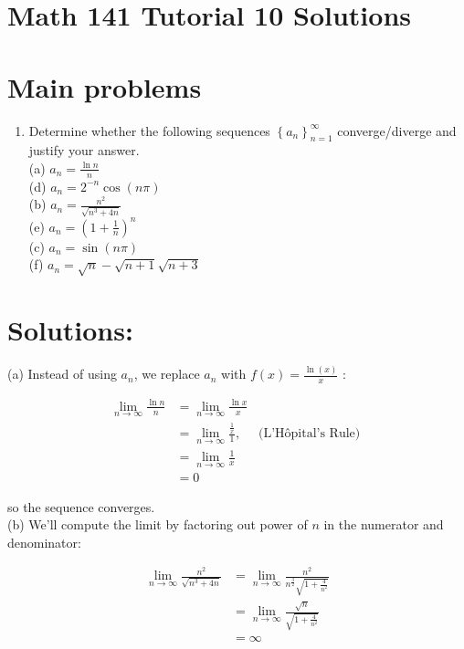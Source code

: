 \documentclass[10pt]{article}
\begin{document}
\section*{Math 141 Tutorial 10 Solutions}
\section*{Main problems}
\begin{enumerate}
  \item Determine whether the following sequences $\left\{a_{n}\right\}_{n=1}^{\infty}$ converge/diverge and justify your answer.\\
(a) $a_{n}=\frac{\ln n}{n}$\\
(d) $a_{n}=2^{-n} \cos (n \pi)$\\
(b) $a_{n}=\frac{n^{2}}{\sqrt{n^{3}+4 n}}$\\
(e) $a_{n}=\left(1+\frac{1}{n}\right)^{n}$\\
(c) $a_{n}=\sin (n \pi)$\\
(f) $a_{n}=\sqrt{n}-\sqrt{n+1} \sqrt{n+3}$
\end{enumerate}

\section*{Solutions:}
(a) Instead of using $a_{n}$, we replace $a_{n}$ with $f(x)=\frac{\ln (x)}{x}$ :

$$
\begin{aligned}
\lim _{n \rightarrow \infty} \frac{\ln n}{n} & =\lim _{n \rightarrow \infty} \frac{\ln x}{x} \\
& =\lim _{n \rightarrow \infty} \frac{\frac{1}{x}}{1}, \quad \text { (L'Hôpital's Rule) } \\
& =\lim _{n \rightarrow \infty} \frac{1}{x} \\
& =0
\end{aligned}
$$

so the sequence converges.\\
(b) We'll compute the limit by factoring out power of $n$ in the numerator and denominator:

$$
\begin{aligned}
\lim _{n \rightarrow \infty} \frac{n^{2}}{\sqrt{n^{3}+4 n}} & =\lim _{n \rightarrow \infty} \frac{n^{2}}{n^{\frac{3}{2}} \sqrt{1+\frac{4}{n^{2}}}} \\
& =\lim _{n \rightarrow \infty} \frac{\sqrt{n}}{\sqrt{1+\frac{4}{n^{2}}}} \\
& =\infty
\end{aligned}
$$
\end{document}
